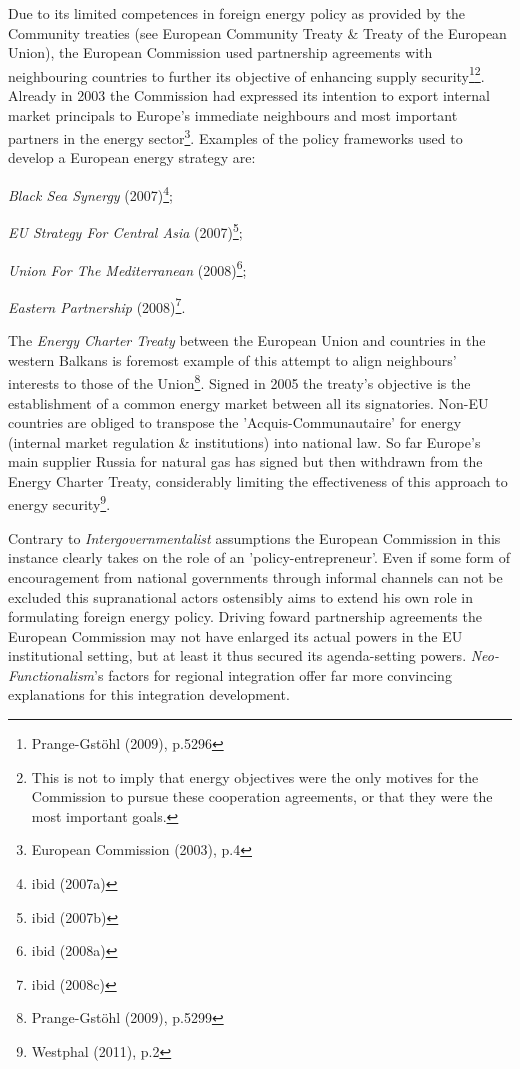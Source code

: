 \documentclass[11pt,a4paper,english]{scrreprt}
\begin{document}
Due to its limited competences in foreign energy policy as provided by the
Community treaties (see European Community Treaty \& Treaty of the European
Union), the European Commission used partnership agreements with neighbouring
countries to further its objective of enhancing supply
security\footnote{Prange-Gst\"ohl (2009),
p.5296}\footnote{\textcolor{dunkelgrau.80}{This is not to imply that energy
objectives were the only motives for the Commission to pursue these cooperation
agreements, or that they were the most important goals.}}. Already in 2003 the
Commission had expressed its intention to export internal market principals to
Europe's immediate neighbours and most important partners in the energy
sector\footnote{European Commission (2003), p.4}. Examples of the policy
frameworks used to develop a European energy strategy are:
  \begin{inparaitem}\item \emph{Black Sea Synergy} (2007)\footnote{ibid
(2007a)}; \item \emph{EU Strategy For Central Asia} (2007)\footnote{ibid
(2007b)}; \item \emph{Union For The Mediterranean} (2008)\footnote{ibid
(2008a)}; \item \emph{Eastern Partnership} (2008)\footnote{ibid (2008c)}. 
  \end{inparaitem}
The \emph{Energy Charter Treaty} between the European Union and countries in
the western Balkans is foremost example of this attempt to align neighbours'
interests to those of the Union\footnote{Prange-Gst\"ohl (2009), p.5299}.
Signed in 2005 the treaty's objective is the establishment of a common
energy market between all its signatories. Non-EU countries are obliged to
transpose the 'Acquis-Communautaire' for energy (internal market regulation \&
institutions) into national law. So far Europe's main supplier Russia for
natural gas has signed but then withdrawn from the Energy Charter Treaty,
considerably limiting the effectiveness of this approach to energy
security\footnote{Westphal (2011), p.2}.\par

Contrary to \emph{Intergovernmentalist} assumptions the European Commission in
this instance clearly takes on the role of an 'policy-entrepreneur'. Even if
some form of encouragement from national governments through informal channels
can not be excluded this supranational actors ostensibly aims to extend
his own role in formulating foreign energy policy. Driving foward partnership
agreements the European Commission may not have enlarged its actual powers in
the EU institutional setting, but at least it thus secured its agenda-setting
powers. \emph{Neo-Functionalism}'s factors for regional integration offer
far more convincing explanations for this integration development.\par
\end{document}
